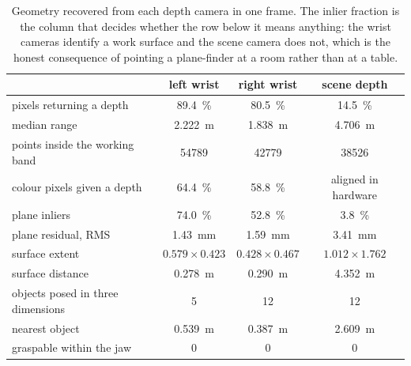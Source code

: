 \begin{table}[htbp]
  \centering
  \small
  \caption[Geometry recovered from each depth camera]{Geometry recovered from
  each depth camera in one frame. The inlier fraction is the column that
  decides whether the row below it means anything: the wrist cameras identify
  a work surface and the scene camera does not, which is the honest
  consequence of pointing a plane-finder at a room rather than at a table.}
  \label{tab:vision-geometry}
  \begin{tabular}{@{}lccc@{}}
    \toprule
    & left wrist & right wrist & scene depth \\
    \midrule
    pixels returning a depth      & \SI{89.4}{\percent} & \SI{80.5}{\percent} & \SI{14.5}{\percent} \\
    median range                  & \SI{2.222}{\metre} & \SI{1.838}{\metre} & \SI{4.706}{\metre} \\
    points inside the working band & \num{54789} & \num{42779} & \num{38526} \\
    colour pixels given a depth   & \SI{64.4}{\percent} & \SI{58.8}{\percent} & aligned in hardware \\
    \midrule
    plane inliers                 & \SI{74.0}{\percent} & \SI{52.8}{\percent} & \SI{3.8}{\percent} \\
    plane residual, RMS           & \SI{1.43}{\milli\metre} & \SI{1.59}{\milli\metre} & \SI{3.41}{\milli\metre} \\
    surface extent                & $\num{0.579}\times\num{0.423}$ & $\num{0.428}\times\num{0.467}$ & $\num{1.012}\times\num{1.762}$ \\
    surface distance              & \SI{0.278}{\metre} & \SI{0.290}{\metre} & \SI{4.352}{\metre} \\
    \midrule
    objects posed in three dimensions & 5 & 12 & 12 \\
    nearest object                & \SI{0.539}{\metre} & \SI{0.387}{\metre} & \SI{2.609}{\metre} \\
    graspable within the jaw      & 0 & 0 & 0 \\
    \bottomrule
  \end{tabular}
\end{table}

